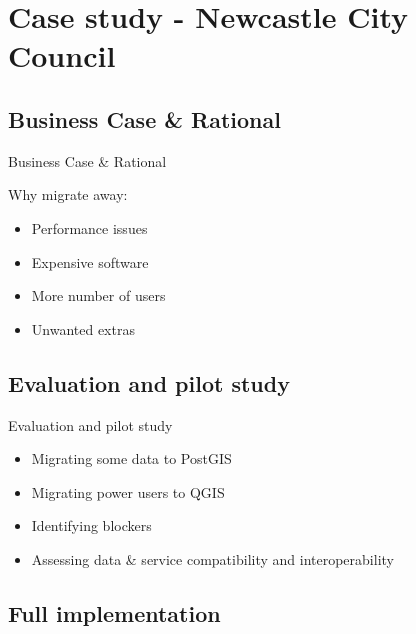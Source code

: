 \section{Case study - Newcastle City Council}
\subsection{Business Case \& Rational}
\begin{frame}{Business Case \& Rational}
	\begin{block}{Why migrate away:}
		\begin{itemize}
			\item Performance issues
			\item Expensive software
			\item More number of users
			\item Unwanted extras
		\end{itemize}
	\end{block}
\end{frame}

\subsection{Evaluation and pilot study}
\begin{frame}{Evaluation and pilot study}
	\begin{block}{}
		\begin{itemize}
			\item Migrating some data to PostGIS
			\item Migrating power users to QGIS
			\item Identifying blockers
			\item Assessing data \& service compatibility and interoperability
		\end{itemize}
	\end{block}
\end{frame}

\subsection{Full implementation}
